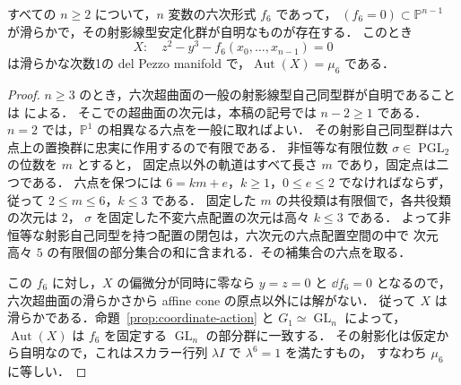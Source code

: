 \begin{lemma}
\label{lemma:mu-six-model}
すべての $n\geq2$ について，$n$ 変数の六次形式 $f_6$ であって，
$(f_6=0)\subset\mathbb P^{n-1}$ が滑らかで，その射影線型安定化群が自明なものが存在する．
このとき
\[
 X:\quad z^2-y^3-f_6(x_0,\ldots,x_{n-1})=0
\]
は滑らかな次数1の del Pezzo manifold で，$\operatorname{Aut}(X)=\mu_6$ である．
\end{lemma}
\begin{proof}
$n\geq3$ のとき，六次超曲面の一般の射影線型自己同型群が自明であることは
\cite[Theorems~1.5 and~1.6]{Poonen2005} による．
そこでの超曲面の次元は，本稿の記号では $n-2\geq1$ である．
$n=2$ では，$\mathbb P^1$ の相異なる六点を一般に取ればよい．
その射影自己同型群は六点上の置換群に忠実に作用するので有限である．
非恒等な有限位数 $\sigma\in\operatorname{PGL}_2$ の位数を $m$ とすると，
固定点以外の軌道はすべて長さ $m$ であり，固定点は二つである．
六点を保つには $6=km+e$，$k\geq1$，$0\leq e\leq2$ でなければならず，
従って $2\leq m\leq6$，$k\leq3$ である．
固定した $m$ の共役類は有限個で，各共役類の次元は $2$，
$\sigma$ を固定した不変六点配置の次元は高々 $k\leq3$ である．
よって非恒等な射影自己同型を持つ配置の閉包は，六次元の六点配置空間の中で
次元高々 $5$ の有限個の部分集合の和に含まれる．その補集合の六点を取る．

この $f_6$ に対し，$X$ の偏微分が同時に零なら $y=z=0$ と $\dd f_6=0$ となるので，
六次超曲面の滑らかさから affine cone の原点以外には解がない．
従って $X$ は滑らかである．命題~\ref{prop:coordinate-action} と $G_1\simeq\operatorname{GL}_n$ によって，
$\operatorname{Aut}(X)$ は $f_6$ を固定する $\operatorname{GL}_n$ の部分群に一致する．
その射影化は仮定から自明なので，これはスカラー行列 $\lambda I$ で $\lambda^6=1$ を満たすもの，
すなわち $\mu_6$ に等しい．
\end{proof}

